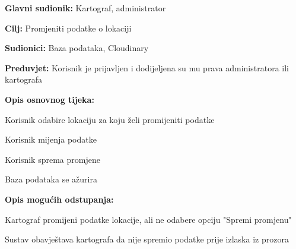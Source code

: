 				
					\noindent {}
					\begin{packed_item}
						
						\item \textbf{Glavni sudionik: }Kartograf, administrator
						\item  \textbf{Cilj:} Promjeniti podatke o lokaciji
						\item  \textbf{Sudionici:} Baza podataka, Cloudinary
						\item  \textbf{Preduvjet:} Korisnik je prijavljen i dodijeljena su mu prava administratora ili kartografa
						\item  \textbf{Opis osnovnog tijeka:}
						
						\item[] \begin{packed_enum}
							
							\item Korisnik odabire lokaciju za koju želi promijeniti podatke
							\item Korisnik mijenja podatke
							\item Korisnik sprema promjene
							\item Baza podataka se ažurira
						\end{packed_enum}
						
						\item  \textbf{Opis mogućih odstupanja:}
						
						\item[] \begin{packed_item}
							
							\item Kartograf promijeni podatke lokacije, ali ne odabere opciju "Spremi promjenu"
							\item[] \begin{packed_enum}
								\item Sustav obavještava kartografa da nije spremio podatke prije izlaska iz prozora
							\end{packed_enum}
						\end{packed_item}
					\end{packed_item}
				
